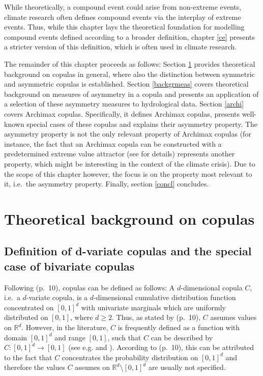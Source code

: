\documentclass[
]{krantz}
\begin{document}
While theoretically, a compound event could arise from non-extreme events, climate research often defines compound events via the interplay of extreme events. Thus, while this chapter lays the theoretical foundation for modelling compound events defined according to a broader definition, chapter \ref{ce} presents a stricter version of this definition, which is often used in climate research.

The remainder of this chapter proceeds as follows: Section \ref{backgrcop} provides theoretical background on copulas in general, where also the distinction between symmetric and asymmetric copulas is established. Section \ref{backgrmeas} covers theoretical background on measures of asymmetry in a copula and presents an application of a selection of these asymmetry measures to hydrological data. Section \ref{archi} covers Archimax copulas. Specifically, it defines Archimax copulas, presents well-known special cases of these copulas and explains their asymmetry property. The asymmetry property is not the only relevant property of Archimax copulas (for instance, the fact that an Archimax copula can be constructed with a predetermined extreme value attractor (see \citet{caperaa2000} for details) represents another property, which might be interesting in the context of the climate crisis). Due to the scope of this chapter however, the focus is on the property most relevant to it, i.e.~the asymmetry property. Finally, section \ref{concl} concludes.

\section{Theoretical background on copulas}\label{backgrcop}

\subsection{Definition of d-variate copulas and the special case of bivariate copulas}\label{defcop}

Following \citet{durante2016} (p.~10), copulas can be defined as follows: A \(d\)-dimensional copula \(C\), i.e.~a \(d\)-variate copula, is a \(d\)-dimensional cumulative distribution function concentrated on \([0,1]^d\) with univariate marginals which are uniformly distributed on \([0,1]\), where \(d \geq 2\). Thus, as stated by \citet{durante2016} (p.~10), \(C\) assumes values on \(\mathbb{R}^d\). However, in the literature, \(C\) is frequently defined as a function with domain \([0,1]^d\) and range \([0,1]\), such that \(C\) can be described by \(C: [0,1]^d \to [0,1]\) (see e.g. \citet{durante2010a} and \citet{klement2006}). According to \citet{durante2016} (p.~10), this can be attributed to the fact that \(C\) concentrates the probability distribution on \([0,1]^d\) and therefore the values \(C\) assumes on \(\mathbb{R}^d \setminus [0,1]^d\) are usually not specified.
\end{document}
